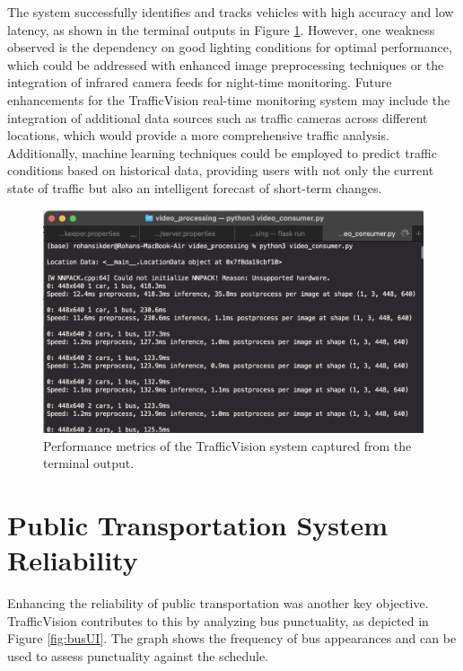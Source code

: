 The system successfully identifies and tracks vehicles with high accuracy and low latency, as shown in the terminal outputs in Figure \ref{fig:pythonTerminal}. However, one weakness observed is the dependency on good lighting conditions for optimal performance, which could be addressed with enhanced image preprocessing techniques or the integration of infrared camera feeds for night-time monitoring.  Future enhancements for the TrafficVision real-time monitoring system may include the integration of additional data sources such as traffic cameras across different locations, which would provide a more comprehensive traffic analysis. Additionally, machine learning techniques could be employed to predict traffic conditions based on historical data, providing users with not only the current state of traffic but also an intelligent forecast of short-term changes.

\begin{figure}[H]
    \centering
    \includegraphics[width=1\linewidth]{images/pythonTerminal.png}
    \caption{Performance metrics of the TrafficVision system captured from the terminal output.}
    \label{fig:pythonTerminal}
\end{figure}

\section{Public Transportation System Reliability}

Enhancing the reliability of public transportation was another key objective. TrafficVision contributes to this by analyzing bus punctuality, as depicted in Figure \ref{fig:busUI}. The graph shows the frequency of bus appearances and can be used to assess punctuality against the schedule.

